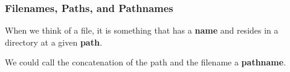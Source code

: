 \begin{frame}

\frametitle{Filenames, Paths, and Pathnames}


\begin{center}

When we think of a file, it is something that has a \textbf{name} and resides
in a directory at a given \textbf{path}.

\vspace{\fill}

We could call the concatenation of the path and the filename a
\textbf{pathname}.

\end{center}

\end{frame}
